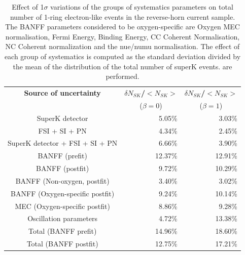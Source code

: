 \begin{table}[htb]
\centering
\begin{tabular}{| c | D{.}{.}{-1} | D{.}{.}{-1} |}
\hline
  {\bf Source of uncertainty}    &  & \\
                                 &  & \\
\hline
  SuperK detector    				& 5.05\%                         & 3.03\%                        \\
  FSI + SI + PN 					& 4.34\%				& 2.45\%			\\
  SuperK detector + FSI + SI + PN     & 6.66\%                         & 3.90\%                        \\
\hline
  BANFF (prefit)                 &  12.37\%                        & 12.91\%                       \\
  BANFF (postfit)                & 9.72\%                         & 10.29\%                        \\
\hline
  BANFF (Non-oxygen, postfit)    	& 3.40\%         	         & 3.02\%                        \\
  BANFF (Oxygen-specific postfit) 	& 9.24\%                    & 10.14\%                        \\
  MEC (Oxygen-specific postfit)	   	& 8.86\%                        	 & 9.28\%                        \\
\hline
  Oscillation parameters         & 4.72\%                         & 13.38\%                       \\
\hline
  Total (BANFF prefit)           &  14.96\%                        & 18.60\%                       \\
  Total (BANFF postfit)          & 12.75\%                         & 17.21\%                       \\
\hline
\end{tabular}
\caption{
 Effect of 1$\sigma$ variations of the groups of systematics parameters on total number of
 1-ring electron-like events in the reverse-horn current sample.
 The BANFF parameters considered to be oxygen-specific are Oxygen MEC normalisation, Fermi Energy, Binding Energy, CC Coherent Normalisation,
 NC Coherent normalization and the nue/numu normalisation. 
The effect of each group of systematics is computed as the standard deviation divided by the mean of the distribution
of the total number of superK events.
\NumToys are performed.
}
\label{tab:nsk_systematic_table_summary}
\end{table}
